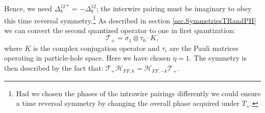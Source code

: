 Hence, we need $\Delta^{12*}_k = - \Delta^{12}_k$; the interwire pairing must be imaginary to obey this time reversal symmetry.\footnote{Had we chosen the phases of the intrawire pairings differently we could ensure a time reversal symmetry by changing the overall phase acquired under $T_+$.} As described in section \ref{sec.SymmetriesTRandPH} we can convert the second quantized operator to one in first quantization:
\begin{equation}
\mathcal{T}_+ = \sigma_1\otimes \tau_0 \cdot K, 
\label{eq.2wiresTpluswireexchangefirstquantization}
\end{equation}
where $K$ is the complex conjugation operator and $\tau_i$ are the Pauli matrices operating in particle-hole space. Here we have chosen $\eta = 1$. The symmetry is then described by the fact that: $\mathcal{T}_+\mathcal{H}_{FF,k} = \mathcal{H}_{FF,-k}\mathcal{T}_+$.

